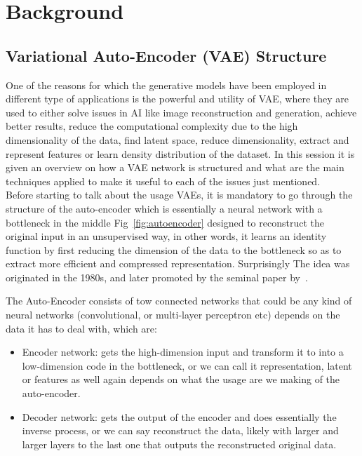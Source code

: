 

\pagestyle{fancy} 
\chapter{Background}
\label{cha:1}
\vspace{1cm}

\section{Variational Auto-Encoder (VAE) Structure}
\label{cha:VAE}
One of the reasons for which the generative models have been employed in different type of applications is the powerful and utility of VAE, where they are used to either solve issues in AI like image reconstruction and generation, achieve better results, reduce the computational complexity due to the high dimensionality of the data, find latent space, reduce dimensionality, extract and represent features or learn density distribution of the dataset. In this session it is given an overview on how a VAE network is structured and what are the main techniques applied to make it useful to each of the issues just mentioned.\\
Before starting to talk about the usage VAEs, it is mandatory to go through the structure of the auto-encoder which is essentially a neural network with a bottleneck in the middle Fig~\ref{fig:autoencoder} designed to reconstruct the original input in an unsupervised way, in other words, it learns an identity function by first reducing the dimension of the data to the bottleneck so as to extract more efficient and compressed representation. Surprisingly The idea was originated in the 1980s, and later promoted by the seminal paper by~\cite{hinton2006reducing}.

\vspace{0.3cm}
The Auto-Encoder consists of tow connected networks that could be any kind of neural networks (convolutional, or multi-layer perceptron etc) depends on the data it has to deal with, which are:
\begin{itemize}
	\item Encoder network: gets the high-dimension input and transform it to into a low-dimension code in the bottleneck, or we can call it representation, latent or features as well again depends on what the usage are we making of the auto-encoder.
	\item Decoder network: gets the output of the encoder and does essentially the inverse process, or we can say reconstruct the data, likely with larger and larger layers to the last one that outputs the reconstructed original data.
\end{itemize}

